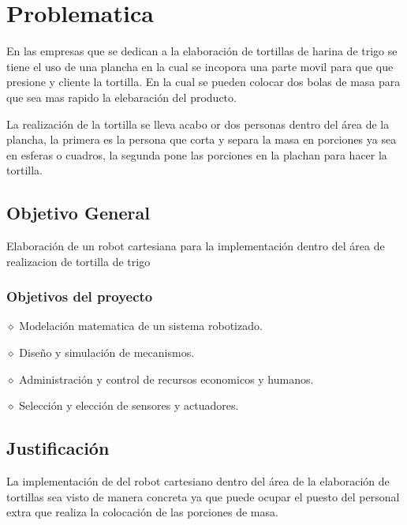 \documentclass[letter,operight,12pt,spanish]{report}
\begin{document}
\maketitle

\section{Problematica}

En las empresas que se dedican a la elaboraci\'on de tortillas de harina de trigo se tiene el uso de una plancha en la cual se incopora una parte movil para que que presione y cliente la tortilla. En la cual se pueden colocar dos bolas de masa para que sea mas rapido la elebaraci\'on del producto.

La realizaci\'on de la tortilla se lleva acabo or dos personas dentro del \'area de la plancha, la primera es la persona que corta y separa la masa en porciones ya sea en esferas o cuadros, la segunda pone las porciones en la plachan para hacer la tortilla.  
\subsection{Objetivo General}

Elaboraci\'on de un robot cartesiana para la implementaci\'on dentro del \'area de realizacion de tortilla de trigo\\

\subsubsection{Objetivos del proyecto}

$\diamond$ Modelaci\'on matematica de un sistema robotizado.

$\diamond$ Diseño y simulaci\'on de mecanismos.

$\diamond$ Administraci\'on y control de recursos economicos y humanos.

$\diamond$ Selecci\'on y elecci\'on de sensores y actuadores.

\subsection{Justificaci\'on}

La implementaci\'on de del robot cartesiano dentro del \'area de la elaboraci\'on de tortillas sea visto de manera concreta ya que puede ocupar el puesto del personal extra que realiza la colocaci\'on de las porciones de masa.
\end{document}
